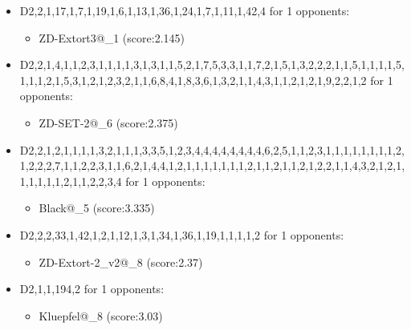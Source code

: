 \begin{appendices}
\begin{itemize}
        \item D2,2,1,17,1,7,1,19,1,6,1,13,1,36,1,24,1,7,1,11,1,42,4 for 1 opponents:
        \begin{multicols}{3}

            \begin{itemize}
                \item ZD-Extort3@\_1 (score:2.145)
            \end{itemize}
        \end{multicols}

        \item D2,2,1,4,1,1,2,3,1,1,1,1,3,1,3,1,1,5,2,1,7,5,3,3,1,1,7,2,1,5,1,3,2,2,2,1,1,5,1,1,1,1,5,1,1,1,2,1,5,3,1,2,1,2,3,2,1,1,6,8,4,1,8,3,6,1,3,2,1,1,4,3,1,1,2,1,2,1,9,2,2,1,2 for 1 opponents:
        \begin{multicols}{3}
            \begin{itemize}
                \item ZD-SET-2@\_6 (score:2.375)
            \end{itemize}
        \end{multicols}

        \item D2,2,1,2,1,1,1,1,3,2,1,1,1,3,3,5,1,2,3,4,4,4,4,4,4,4,4,6,2,5,1,1,2,3,1,1,1,1,1,1,1,1,2,1,2,2,2,7,1,1,2,2,3,1,1,6,2,1,4,4,1,2,1,1,1,1,1,1,1,2,1,1,2,1,1,2,1,2,2,1,1,4,3,2,1,2,1,1,1,1,1,1,2,1,1,2,2,3,4 for 1 opponents:
        \begin{multicols}{3}
            \begin{itemize}
                \item Black@\_5 (score:3.335)
            \end{itemize}
        \end{multicols}

        \item D2,2,2,33,1,42,1,2,1,12,1,3,1,34,1,36,1,19,1,1,1,1,2 for 1 opponents:
        \begin{multicols}{3}
            \begin{itemize}
                \item ZD-Extort-2\_v2@\_8 (score:2.37)
            \end{itemize}
        \end{multicols}

        \item D2,1,1,194,2 for 1 opponents:
        \begin{multicols}{3}
            \begin{itemize}
                \item Kluepfel@\_8 (score:3.03)
            \end{itemize}
        \end{multicols}


\end{itemize}
\end{appendices}
